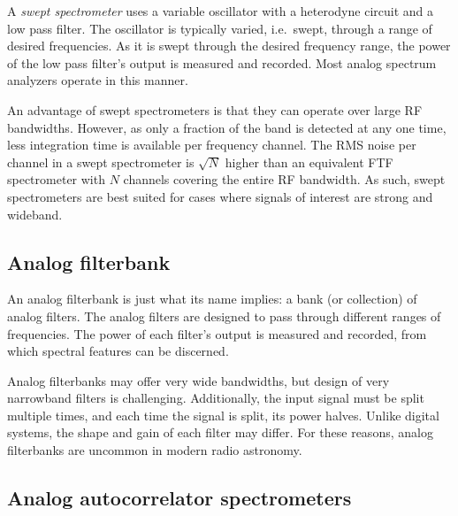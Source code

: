 \documentclass{ws-rv961x669}
\begin{document}
A \emph{swept spectrometer} uses a variable oscillator with a heterodyne
circuit and a low pass filter. The oscillator is typically varied, i.e.~swept, through a range of desired frequencies. As it is swept through the desired frequency range, the power of the low pass filter's output is measured and recorded. Most analog spectrum analyzers operate in this manner.

An advantage of swept spectrometers is that they can operate over large RF bandwidths. However, as only a fraction of the band is detected at any one time, less integration time is available per frequency channel. 
The RMS noise per channel in a swept spectrometer is $\sqrt{N}$ higher than an equivalent FTF spectrometer with $N$ channels covering the entire RF bandwidth. As such, swept spectrometers are best suited for cases where signals of interest are strong and wideband. 

\subsection{Analog filterbank}\label{analog-filter-bank}

An analog filterbank is just what its name implies: a bank (or collection) of analog filters. The analog filters are designed to pass through different ranges of frequencies. The power of each filter's output is measured and recorded, from which spectral features can be discerned. 


Analog filterbanks may offer very wide bandwidths, but design of very narrowband filters is challenging. Additionally, the input signal must be split multiple times, and each time the signal is split, its power halves. Unlike digital systems, the shape and gain of each filter may differ. For these reasons, analog filterbanks are uncommon in modern radio astronomy.

\subsection{Analog autocorrelator spectrometers}\label{sub:analog-acs}
\end{document}
